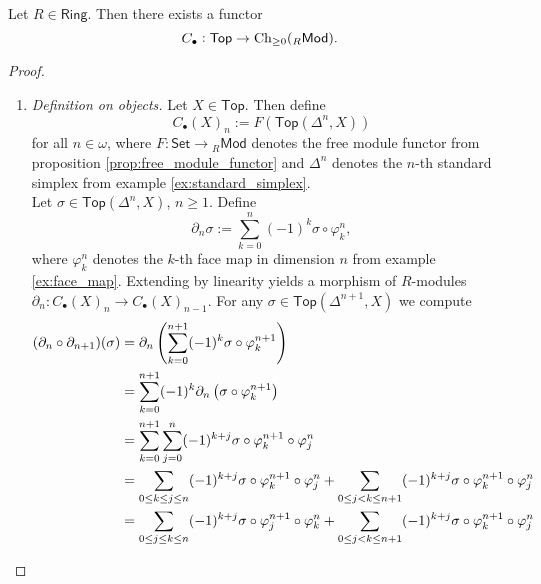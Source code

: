 \begin{theorem}
	\label{thm:singular_chain_complex_functor}
	Let $R \in \mathsf{Ring}$. Then there exists a functor 
	\begin{equation*}
		C_\bullet : \mathsf{Top} \to \operatorname{Ch}_{\geq 0}({_R}\mathsf{Mod}).
	\end{equation*}
\end{theorem}

\begin{proof}
	\begin{enumerate}[label = \textit{Step \arabic*:},wide = 0pt]
		\item \textit{Definition on objects.} Let $X \in \mathsf{Top}$. Then define 
			\begin{equation*}
				C_\bullet(X)_n := F(\mathsf{Top}(\Delta^n,X))
			\end{equation*}
			\noindent for all $n \in \omega$, where $F : \mathsf{Set} \to {_R}\mathsf{Mod}$ denotes the free module functor from proposition \ref{prop:free_module_functor} and $\Delta^n$ denotes the $n$-th standard simplex from example \ref{ex:standard_simplex}.\\
			Let $\sigma \in \mathsf{Top}(\Delta^n,X)$, $n \geq 1$. Define
			\begin{equation}
				\label{eq:boundary_map}
				\partial_n \sigma := \sum_{k = 0}^n (-1)^k \sigma \circ \varphi^n_k,
			\end{equation}
			\noindent where $\varphi^n_k$ denotes the $k$-th face map in dimension $n$ from example \ref{ex:face_map}. Extending by linearity yields a morphism of $R$-modules $\partial_n : C_\bullet(X)_n \to C_\bullet(X)_{n - 1}$. For any $\sigma \in \mathsf{Top}(\Delta^{n + 1},X)$ we compute
			\begin{align*}
				(\partial_n \circ \partial_{n + 1})(\sigma) &= \partial_n \del[4]{\sum_{k = 0}^{n + 1} (-1)^k \sigma \circ \varphi^{n + 1}_k}\\
				&= \sum_{k = 0}^{n + 1} (-1)^k \partial_n\del[1]{\sigma \circ \varphi^{n + 1}_k}\\
				&= \sum_{k = 0}^{n + 1}\sum_{j = 0}^n (-1)^{k + j} \sigma \circ \varphi^{n + 1}_k \circ \varphi^n_j\\
				&= \sum_{0 \leq k \leq j \leq n}(-1)^{k + j} \sigma \circ \varphi^{n + 1}_k \circ \varphi^n_j + \sum_{0 \leq j < k \leq n + 1}(-1)^{k + j} \sigma \circ \varphi^{n + 1}_k \circ \varphi^n_j\\
				&= \sum_{0 \leq j \leq k \leq n}(-1)^{k + j} \sigma \circ \varphi^{n + 1}_j \circ \varphi^n_k + \sum_{0 \leq j <k \leq n + 1}(-1)^{k + j} \sigma \circ \varphi^{n + 1}_k \circ \varphi^n_j\\

\end{align*}
\end{enumerate}
\end{proof}
